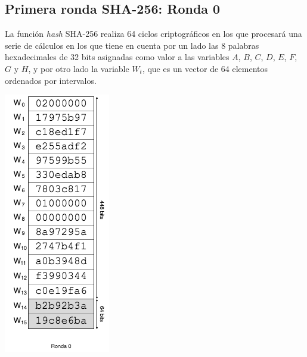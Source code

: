 \documentclass{article}
\begin{document}
    \subsection{Primera ronda SHA-256: Ronda 0}
    La función \textit{hash} SHA-256 realiza 64 ciclos criptográficos en los que procesará una serie de cálculos en los que tiene en cuenta por un lado las 8 palabras hexadecimales de 32 bits asignadas como valor a las variables $A$, $B$, $C$, $D$, $E$, $F$, $G$ y $H$, y por otro lado la variable $W_t$, que es un vector de 64 elementos ordenados por intervalos.
    
    \noindent\begin{minipage}{0.3\textwidth}
    \includegraphics[scale=0.59]{img/Bitcoin_block_SHA_256_W0_W15_ronda_0}
    \end{minipage}
    \hfill
\end{document}
